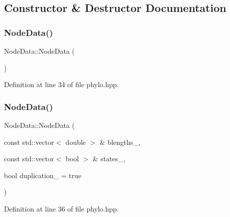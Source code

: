 \subsection{Constructor \& Destructor Documentation}
\mbox{\label{class_node_data_a56da12a9de7c80c25a905012749c8671}} 
\subsubsection{\texorpdfstring{Node\+Data()}{NodeData()}\hspace{0.1cm}{\footnotesize\ttfamily [1/2]}}
{\footnotesize\ttfamily Node\+Data\+::\+Node\+Data (\begin{DoxyParamCaption}{ }\end{DoxyParamCaption})\hspace{0.3cm}{\ttfamily [inline]}}



Definition at line 34 of file phylo.\+hpp.

\mbox{\label{class_node_data_a0a90191ba4c987afa3406f829967d8e2}} 
\subsubsection{\texorpdfstring{Node\+Data()}{NodeData()}\hspace{0.1cm}{\footnotesize\ttfamily [2/2]}}
{\footnotesize\ttfamily Node\+Data\+::\+Node\+Data (\begin{DoxyParamCaption}\item[{const std\+::vector$<$ double $>$ \&}]{blengths\+\_\+,  }\item[{const std\+::vector$<$ bool $>$ \&}]{states\+\_\+,  }\item[{bool}]{duplication\+\_\+ = {\ttfamily true} }\end{DoxyParamCaption})\hspace{0.3cm}{\ttfamily [inline]}}



Definition at line 36 of file phylo.\+hpp.

\mbox{\label{class_node_data_ad870d466c40b9be96ad79adccab79038}} 
